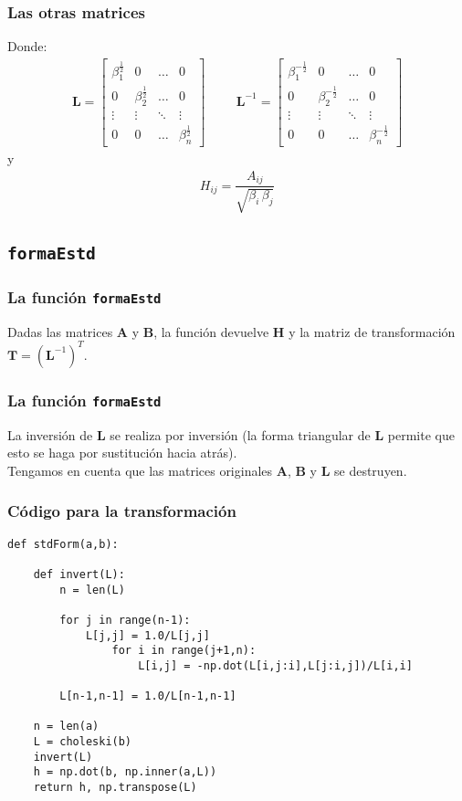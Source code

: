 \documentclass[12pt]{beamer}
\begin{document}
\begin{frame}
\frametitle{Las otras matrices}
Donde:
\pause
\renewcommand{\arraystretch}{1}
\begin{align}
\mathbf{L} =
\begin{bmatrix}
\beta_{1}^{\frac{1}{2}} & 0 & \ldots & 0 \\
0 & \beta_{2}^{\frac{1}{2}} & \ldots & 0 \\
\vdots & \vdots & \ddots & \vdots \\
0 & 0 & \ldots & \beta_{n}^{\frac{1}{2}}
\end{bmatrix}
\hspace{1cm}
\mathbf{L}^{-1} =
\begin{bmatrix}
\beta_{1}^{-\frac{1}{2}} & 0 & \ldots & 0 \\
0 & \beta_{2}^{-\frac{1}{2}} & \ldots & 0 \\
\vdots & \vdots & \ddots & \vdots \\
0 & 0 & \ldots & \beta_{n}^{-\frac{1}{2}}
\end{bmatrix}
\label{eq:ecuacion_09_26a}
\end{align}
y
\begin{align}
H_{ij} = \dfrac{A_{ij}}{\sqrt{\beta_{i} \, \beta_{j}}}
\end{align}
\end{frame}

\subsection{\texttt{formaEstd}}

\begin{frame}
\frametitle{La función \texttt{formaEstd}}
Dadas las matrices $\mathbf{A}$ y $\mathbf{B}$, la función  devuelve $\mathbf{H}$ y la matriz de transformación $\mathbf{T} = (\mathbf{L}^{-1})^{T}$.
\end{frame}
\begin{frame}
\frametitle{La función \texttt{formaEstd}}
La inversión de $\mathbf{L}$ se realiza por inversión (la forma triangular de $\mathbf{L}$ permite que esto se haga por sustitución hacia atrás).
\\
\bigskip
\pause
Tengamos en cuenta que las matrices originales $\mathbf{A}$, $\mathbf{B}$ y $\mathbf{L}$ se destruyen.
\end{frame}
\begin{frame}
\frametitle{Código para la transformación}
\begin{lstlisting}[caption=Código para la forma estándar]
def stdForm(a,b):

    def invert(L):
        n = len(L)
        
        for j in range(n-1):
            L[j,j] = 1.0/L[j,j]
                for i in range(j+1,n):
                    L[i,j] = -np.dot(L[i,j:i],L[j:i,j])/L[i,i]

        L[n-1,n-1] = 1.0/L[n-1,n-1]
    
    n = len(a)
    L = choleski(b)
    invert(L)
    h = np.dot(b, np.inner(a,L))
    return h, np.transpose(L)
\end{lstlisting}
\end{frame}
\end{document}
